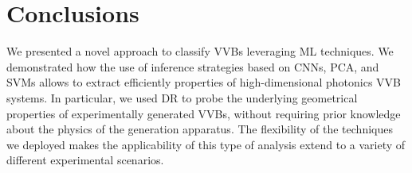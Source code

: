 \section{Conclusions}
\label{sec:VVBs:conclusions}

We presented a novel approach to classify \acp{VVB} leveraging ML techniques. We demonstrated how the use of inference strategies based on CNNs, PCA, and SVMs allows to extract efficiently properties of high-dimensional photonics \ac{VVB} systems.
In particular, we used DR to probe the underlying geometrical properties of experimentally generated VVBs, without requiring prior knowledge about the physics of the generation apparatus.
The flexibility of the techniques we deployed makes the applicability of this type of  analysis extend to a variety of different experimental scenarios.
